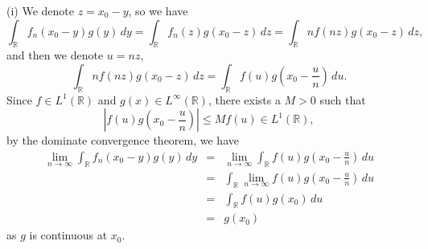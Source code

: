 \documentclass[12pt]{article}
\begin{document}
(i) We denote $z = x_{0} - y$, so we have
\begin{equation*}
    \int_{\mathbb{R}}^{} f_{n}(x_{0} - y) g(y) \, d y = \int_{\mathbb{R}}^{} f_{n}(z) g(x_{0} - z) \, d z = \int_{\mathbb{R}}^{} n f(n z) g(x_{0} - z) \, d z,
\end{equation*}
and then we denote $u = n z$,
\begin{equation*}
    \int_{\mathbb{R}}^{} n f(n z) g(x_{0} - z) \, d z = \int_{\mathbb{R}}^{}  f(u) g(x_{0} - \frac{u}{n}) \, d u.
\end{equation*}
Since $f \in L^{1} (\mathbb{R})$ and $g(x) \in L^{\infty}(\mathbb{R})$, there exists a $M > 0$ such that
\begin{equation*}
    |f(u) g(x_{0} - \frac{u}{n})| \leq M f(u) \in L^{1}(\mathbb{R}),
\end{equation*}
by the dominate convergence theorem, we have
\begin{eqnarray*}
    \lim_{n \to \infty} \int_{\mathbb{R}}^{} f_{n}(x_{0} - y) g(y) \, d y & = &  \lim_{n \to \infty} \int_{\mathbb{R}}^{}  f(u) g(x_{0} - \frac{u}{n}) \, d u \\
    & = & \int_{\mathbb{R}}^{} \lim_{n \to \infty} f(u) g(x_{0} - \frac{u}{n}) \, d u \\
    & = & \int_{\mathbb{R}}^{} f(u) g(x_{0}) \, d u \\
    & = & g(x_{0})
\end{eqnarray*}
as $g$ is continuous at $x_{0}$.

\vspace{4pt}
\end{document}
